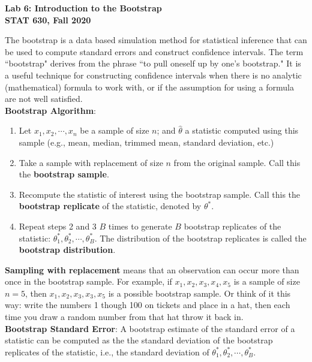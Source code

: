 \documentclass[fleqn, 12pt]{article}\usepackage[]{graphicx}\usepackage[]{color}
\begin{document}
\setlength\parindent{0pt}

\Large
\textbf{Lab 6: Introduction to the Bootstrap}\\
\large
\textbf{STAT 630, Fall 2020}\\
\normalsize

The bootstrap is a data based simulation method for statistical inference that can be used to compute standard errors and construct confidence intervals.  The term ``bootstrap" derives from the phrase ``to pull oneself up by one's bootstrap."  It is a useful technique for constructing confidence intervals when there is no analytic (mathematical) formula to work with, or if the assumption for using a formula are not well satisfied.\\  

\textbf{Bootstrap Algorithm}:
\begin{enumerate}
\item Let $x_1, x_2, \cdots, x_n$ be a sample of size $n$; and $\hat{\theta}$ a statistic computed using this sample (e.g., mean, median, trimmed mean, standard deviation, etc.)
\item Take a sample with replacement of size $n$ from the original sample.  Call this the \textbf{bootstrap sample}.
\item Recompute the statistic of interest using the bootstrap sample.  Call this the \textbf{bootstrap replicate} of the statistic, denoted by $\theta^*$.
\item Repeat steps 2 and 3 $B$ times to generate $B$ bootstrap replicates of the statistic: $\theta_1^*, \theta_2^*, \cdots, \theta_B^*$.  The distribution of the bootstrap replicates is called the \textbf{bootstrap distribution}.\\
\end{enumerate}

\textbf{Sampling with replacement} means that an observation can occur more than once in the bootstrap sample.  For example, if $x_1, x_2, x_3, x_4, x_5$ is a sample of size $n=5$, then $x_1, x_2, x_3, x_3, x_5$ is a possible bootstrap sample.  Or think of it this way: write the numbers 1 though 100 on tickets and place in a hat, then each time you draw a random number from that hat throw it back in.\\ 

\textbf{Bootstrap Standard Error}:  A bootstrap estimate of the standard error of a statistic can be computed as the the standard deviation of the bootstrap replicates of the statistic, i.e., the standard deviation of $\theta_1^*, \theta_2^*, \cdots, \theta_B^*$.\\
\end{document}
